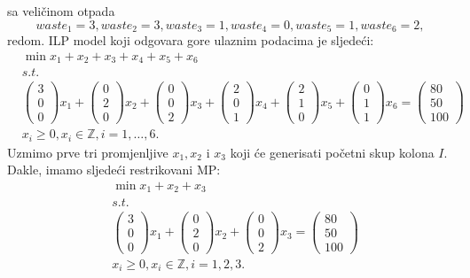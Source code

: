 \documentclass[a4paper, utf8, 11pt, colorlinks]{book}
\theoremstyle{definition}
\begin{document}
sa veličinom otpada 
$$ waste_1 = 3, waste_2 = 3, waste_3 = 1, waste_4 = 0, waste_5 = 1, waste_6 = 2,$$
redom. 
ILP model koji odgovara gore ulaznim podacima je sljedeći:
\begin{align*}
	 &\min x_1 + x_2 + x_3 + x_4 + x_5 + x_6 \\
	 &s.t. \\
	 &\begin{pmatrix}
	 	3 \\
	 	0 \\
	 	0  
	 \end{pmatrix} x_1 + \begin{pmatrix}
	 0 \\
	 2 \\
	 0  
 \end{pmatrix} x_2 +\begin{pmatrix}
 0 \\
 0 \\
 2  
\end{pmatrix} x_3 + 
 \begin{pmatrix}
	2 \\
	0 \\
	1  
\end{pmatrix} x_4 + 
 \begin{pmatrix}
	2 \\
	1 \\
	0  
\end{pmatrix} x_5 + 
\begin{pmatrix}
	0 \\
	1 \\
	1  
\end{pmatrix} x_6 = \begin{pmatrix}
      80 \\
      50 \\
      100
\end{pmatrix} \\
& x_i \geq 0, x_i \in \mathbb{Z}, i=1,\ldots,6.
\end{align*}
 Uzmimo prve tri promjenljive $x_1, x_2$ i $x_3$ koji će generisati početni skup kolona $I$.
 Dakle, imamo sljedeći restrikovani MP:
 \begin{align*}
 	 &\min x_1 + x_2 + x_3 \\
 	 & s.t. \\
 	 &\begin{pmatrix}
 	 	3 \\
 	 	0 \\
 	 	0  
 	 \end{pmatrix} x_1 + \begin{pmatrix}
 	 	0 \\
 	 	2 \\
 	 	0  
 	 \end{pmatrix} x_2 +\begin{pmatrix}
 	 	0 \\
 	 	0 \\
 	 	2  
 	 \end{pmatrix} x_3 = \begin{pmatrix}
  	     80 \\
  	     50 \\
  	     100
  \end{pmatrix} \\
  & x_i \geq 0, x_i \in \mathbb{Z}, i=1,2,3.
 \end{align*}  
\end{document}
